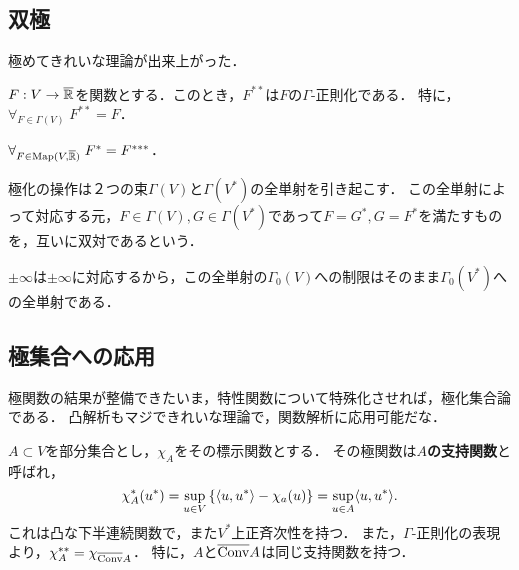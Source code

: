 \documentclass[uplatex,dvipdfmx]{jsreport}
\begin{document}
\subsection{双極}

\begin{tcolorbox}[colframe=ForestGreen, colback=ForestGreen!10!white,breakable,colbacktitle=ForestGreen!40!white,coltitle=black,fonttitle=\bfseries\sffamily,
title=]
    極めてきれいな理論が出来上がった．
\end{tcolorbox}

\begin{proposition}
    $F:V\to\overline{\mathbb{R}}$を関数とする．このとき，$F^{**}$は$F$の$\Gamma$-正則化である．
    特に，$\forall_{F\in\Gamma(V)}\;F^{**}=F$．
\end{proposition}

\begin{corollary}
    $\forall_{F\in\mathrm{Map}(V,\overline{\mathbb{R}})}\;F^*=F^{***}$．
\end{corollary}

\begin{definition}[duality]
    極化の操作は２つの束$\Gamma(V)$と$\Gamma(V^*)$の全単射を引き起こす．
    この全単射によって対応する元，$F\in\Gamma(V),G\in\Gamma(V^*)$であって$F=G^*,G=F^*$を満たすものを，互いに双対であるという．
\end{definition}
\begin{remark}
    $\pm\infty$は$\pm\infty$に対応するから，この全単射の$\Gamma_0(V)$への制限はそのまま$\Gamma_0(V^*)$への全単射である．
\end{remark}

\subsection{極集合への応用}

\begin{tcolorbox}[colframe=ForestGreen, colback=ForestGreen!10!white,breakable,colbacktitle=ForestGreen!40!white,coltitle=black,fonttitle=\bfseries\sffamily,
title=]
    極関数の結果が整備できたいま，特性関数について特殊化させれば，極化集合論である．
    凸解析もマジできれいな理論で，関数解析に応用可能だな．
\end{tcolorbox}

\begin{example}
    $A\subset V$を部分集合とし，$\chi_A$をその標示関数とする．
    その極関数は\textbf{$A$の支持関数}と呼ばれ，
    \[\chi_A^*(u^*)=\sup_{u\in V}\left\{\langle u,u^*\rangle-\chi_a(u)\right\}=\sup_{u\in A}\langle u,u^*\rangle.\]
    これは凸な下半連続関数で，また$V^*$上正斉次性を持つ．
    また，$\Gamma$-正則化の表現より，$\chi_A^{**}=\chi_{\overline{\mathrm{Conv}}A}$．
    特に，$A$と$\overline{\mathrm{Conv}}A$は同じ支持関数を持つ．
\end{example}
\end{document}
